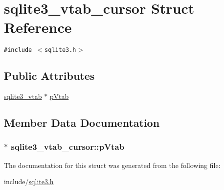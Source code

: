 \hypertarget{structsqlite3__vtab__cursor}{
\section{sqlite3\_\-vtab\_\-cursor Struct Reference}
\label{structsqlite3__vtab__cursor}
}
{\tt \#include $<$sqlite3.h$>$}

\subsection*{Public Attributes}
\begin{CompactItemize}
\item 
\hyperlink{structsqlite3__vtab}{sqlite3\_\-vtab} $\ast$ \hyperlink{structsqlite3__vtab__cursor_2989d9f84a35506c3ef9fe9e9ecd3365}{pVtab}
\end{CompactItemize}


\subsection{Member Data Documentation}
\hypertarget{structsqlite3__vtab__cursor_2989d9f84a35506c3ef9fe9e9ecd3365}{
\subsubsection[pVtab]{$\ast$ {\bf sqlite3\_\-vtab\_\-cursor::pVtab}}}
\label{structsqlite3__vtab__cursor_2989d9f84a35506c3ef9fe9e9ecd3365}




The documentation for this struct was generated from the following file:\begin{CompactItemize}
\item 
include/\hyperlink{sqlite3_8h}{sqlite3.h}\end{CompactItemize}
